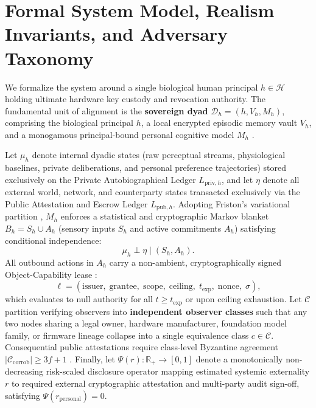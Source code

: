 \documentclass[11pt]{article}
\begin{document}
\section{Formal System Model, Realism Invariants, and Adversary Taxonomy}\label{sec:formal}

We formalize the system around a single biological human principal $h \in \mathcal{H}$ holding ultimate hardware key custody and revocation authority. The fundamental unit of alignment is the \textbf{sovereign dyad} $\mathcal{D}_h = (h, V_h, M_h)$, comprising the biological principal $h$, a local encrypted episodic memory vault $V_h$, and a monogamous principal-bound personal cognitive model $M_h$ \citep{bach2009psi, balkin2016fiduciaries}.

Let $\mu_h$ denote internal dyadic states (raw perceptual streams, physiological baselines, private deliberations, and personal preference trajectories) stored exclusively on the Private Autobiographical Ledger $L_{\mathrm{priv},h}$, and let $\eta$ denote all external world, network, and counterparty states transacted exclusively via the Public Attestation and Escrow Ledger $L_{\mathrm{pub},h}$. Adopting Friston's variational partition \citep{friston2013life}, $M_h$ enforces a statistical and cryptographic Markov blanket $B_h = S_h \cup A_h$ (sensory inputs $S_h$ and active commitments $A_h$) satisfying conditional independence:
\begin{equation}
  \mu_h \perp \eta \;\big|\; (S_h, A_h).
  \label{eq:markov}
\end{equation}
All outbound actions in $A_h$ carry a non-ambient, cryptographically signed Object-Capability lease \citep{dennis1966programming}:
\begin{equation}
  \ell = (\mathrm{issuer},\; \mathrm{grantee},\; \mathrm{scope},\; \mathrm{ceiling},\; t_{\mathrm{exp}},\; \mathrm{nonce},\; \sigma),
  \label{eq:lease}
\end{equation}
which evaluates to null authority for all $t \ge t_{\mathrm{exp}}$ or upon ceiling exhaustion. Let $\mathcal{C}$ partition verifying observers into \textbf{independent observer classes} such that any two nodes sharing a legal owner, hardware manufacturer, foundation model family, or firmware lineage collapse into a single equivalence class $c \in \mathcal{C}$. Consequential public attestations require class-level Byzantine agreement $|\mathcal{C}_{\mathrm{corrob}}| \ge 3f + 1$ \citep{lamport1982byzantine}. Finally, let $\Psi(r): \mathbb{R}_+ \to [0,1]$ denote a monotonically non-decreasing risk-scaled disclosure operator mapping estimated systemic externality $r$ to required external cryptographic attestation and multi-party audit sign-off, satisfying $\Psi(r_{\mathrm{personal}}) = 0$.
\end{document}

